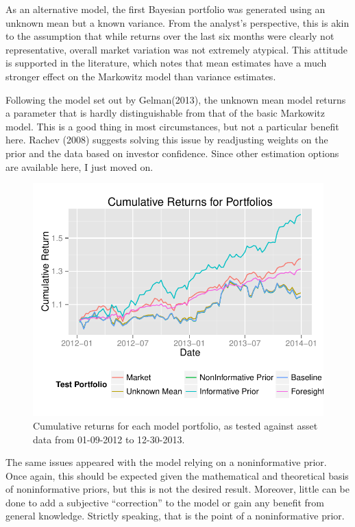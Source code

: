 \documentclass[a4paper]{article}\usepackage[]{graphicx}\usepackage[]{color}
\makeatletter
\def\maxwidth{ %
  \ifdim\Gin@nat@width>\linewidth
    \linewidth
  \else
    \Gin@nat@width
  \fi
}
\newenvironment{knitrout}{}{} %
\makeatother
\begin{document}
As an alternative model, the first Bayesian portfolio was generated using an unknown mean but a known variance. From the analyst's perspective, this is akin to the assumption that while returns over the last six months were clearly not representative, overall market variation was not extremely atypical. This attitude is supported in the literature, which notes that mean estimates have a much stronger effect on the Markowitz model than variance estimates.

Following the model set out by Gelman(2013), \cite{gelman13} the unknown mean model returns a parameter that is hardly distinguishable from that of the basic Markowitz model. This is a good thing in most circumstances, but not a particular benefit here. Rachev (2008) suggests solving this issue by readjusting weights on the prior and the data based on investor confidence. \cite{rachev08} Since other estimation options are available here, I just moved on.

\begin{figure}[t]
    \centering
\begin{knitrout}
\color{fgcolor}
\includegraphics[width=\maxwidth]{figure/results-1} 

\end{knitrout}
    \caption{Cumulative returns for each model portfolio, as tested against asset data from 01-09-2012 to 12-30-2013.}
    \label{fig:cumret}
\end{figure}

The same issues appeared with the model relying on a noninformative prior. Once again, this should be expected given the mathematical and theoretical basis of noninformative priors, but this is not the desired result. Moreover, little can be done to add a subjective ``correction'' to the model or gain any benefit from general knowledge. Strictly speaking, that is the point of a noninformative prior. 
\end{document}
